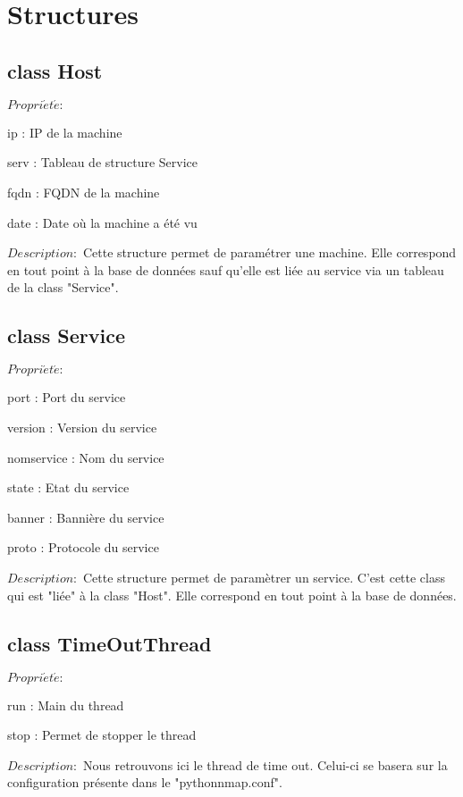 \documentclass[12pt]{report}
\begin{document}
	\chapter{Structures}
		\section{class Host}
			{\setlength{\parindent}{0cm}
			$Propri\acute{e}t\acute{e} :$
			}
			\begin{description}
				\item ip : IP de la machine
				\item serv : Tableau de structure Service
				\item fqdn : FQDN de la machine
				\item date : Date où la machine a été vu
			\end{description}
			$Description :$ Cette structure permet de paramétrer une machine. Elle correspond en tout point à la base de données sauf qu'elle est liée au service via un tableau de la class "Service".
		\section{class Service}
			{\setlength{\parindent}{0cm}
			$Propri\acute{e}t\acute{e} :$
			}
			\begin{description}
				\item port : Port du service
				\item version : Version du service
				\item nomservice : Nom du service
				\item state : Etat du service
				\item banner : Bannière du service
				\item proto : Protocole du service
			\end{description}
			$Description :$ Cette structure permet de paramètrer un service. C'est cette class qui est "liée" à la class "Host". Elle correspond en tout point à la base de données.
		\section{class TimeOutThread}
			{\setlength{\parindent}{0cm}
			$Propri\acute{e}t\acute{e} :$
			}
			\begin{description}
				\item run : Main du thread
				\item stop : Permet de stopper le thread
			\end{description}
			$Description :$ Nous retrouvons ici le thread de time out. Celui-ci se basera sur la configuration présente dans le "pythonnmap.conf".
\end{document}
